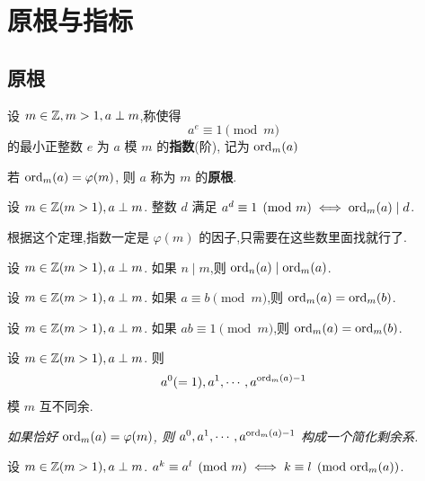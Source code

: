 \section{原根与指标}

\subsection{原根}

\begin{definition}[指数]
    设 $m \in \mathbb{Z}, m > 1, a \perp m$,称使得
    $$a^e \equiv 1 \pmod{m}$$
    的最小正整数 $e$ 为 $a$ 模 $m$ 的\textbf{指数}(阶), 记为 $\mathrm{ord}_{m}(a)$
\end{definition}

\begin{definition}[原根]
    若 $\mathrm{ord}_{m}(a) = \varphi(m)$, 则 $a$ 称为 $m$ 的\textbf{原根}.
\end{definition}

\begin{theorem}
    设 $m \in \mathbb{Z}(m>1),a \perp m$. 整数 $d$ 满足 $a^d \equiv 1 \pmod{m} \iff \mathrm{ord}_{m}(a) \mid d$.
\end{theorem}

根据这个定理,指数一定是 $\varphi(m)$ 的因子,只需要在这些数里面找就行了.

\begin{theorem}
    设 $m \in \mathbb{Z}(m>1),a \perp m$. 如果 $n \mid m$,则 $\mathrm{ord}_{n}(a) \mid \mathrm{ord}_{m}(a)$.
\end{theorem}

\begin{theorem}
    设 $m \in \mathbb{Z}(m>1),a \perp m$. 如果 $a \equiv b \pmod{m}$,则 $\mathrm{ord}_{m}(a) = \mathrm{ord}_{m}(b)$.
\end{theorem}

\begin{theorem}
    设 $m \in \mathbb{Z}(m>1),a \perp m$. 如果 $ab \equiv 1 \pmod{m}$,则 $\mathrm{ord}_{m}(a) = \mathrm{ord}_{m}(b)$.
\end{theorem}

\begin{theorem}
    设 $m \in \mathbb{Z}(m>1),a \perp m$. 则 
    $$a^0(=1),a^1,\cdots,a^{\mathrm{ord}_{m}(a)-1}$$
    模 $m$ 互不同余.
\end{theorem}

\textit{如果恰好 $\mathrm{ord}_{m}(a) = \varphi(m)$, 则 $a^0, a^1, \cdots, a^{\mathrm{ord}_{m}(a)-1}$ 构成一个简化剩余系.}

\begin{theorem}
    设 $m \in \mathbb{Z}(m>1),a \perp m$. $a^k \equiv a^l \pmod{m} \iff k \equiv l \pmod{\mathrm{ord}_{m}(a)}$.
\end{theorem}

